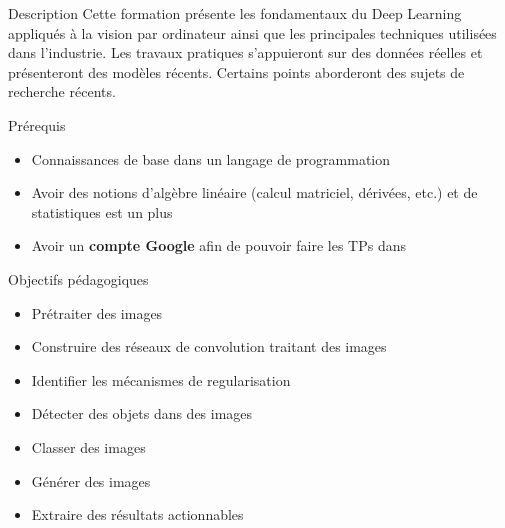 
\begin{frame}{Description}
  Cette formation présente les fondamentaux du Deep Learning appliqués à la vision par ordinateur ainsi que les principales techniques utilisées dans l'industrie.
  Les travaux pratiques s'appuieront sur des données réelles et présenteront des modèles récents.
  Certains points aborderont des sujets de recherche récents.
\end{frame}


\begin{frame}{Prérequis}
  \begin{itemize}
    \item Connaissances de base dans un langage de programmation
    \item Avoir des notions d'algèbre linéaire (calcul matriciel, dérivées, etc.) et de statistiques est un plus
    \item Avoir un \textbf{compte Google} afin de pouvoir faire les TPs dans 
  \end{itemize}
\end{frame}

\begin{frame}{Objectifs pédagogiques}
  \begin{itemize}
    \item Prétraiter des images
    \item Construire des réseaux de convolution traitant des images
    \item Identifier les mécanismes de regularisation
    \item Détecter des objets dans des images
    \item Classer des images
    \item Générer des images
    \item Extraire des résultats actionnables
  \end{itemize}
\end{frame}
